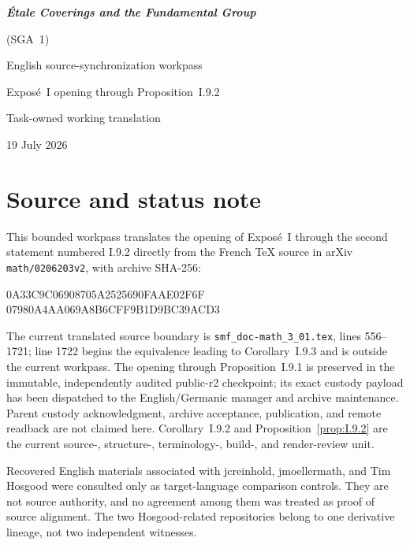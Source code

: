 \documentclass[11pt,oneside]{amsbook}
\begin{document}
\frontmatter
\begin{titlepage}
  \centering
  \vspace*{35mm}
  {\Huge\bfseries \textit{Étale Coverings and the Fundamental Group}\par}
  \vspace{3mm}
  {\LARGE (SGA~1)\par}
  \vspace{20mm}
  {\Large English source-synchronization workpass\par}
  \vspace{3mm}
  {\Large Exposé~I opening through Proposition~I.9.2\par}
  \vfill
  {\large Task-owned working translation\par}
  \vspace{5mm}
  {\large 19 July 2026\par}
\end{titlepage}

\chapter*{Source and status note}

This bounded workpass translates the opening of Exposé~I through the second
statement numbered I.9.2 directly
from the French \TeX{} source in arXiv \texttt{math/0206203v2}, with archive
SHA-256:
\begin{center}
  \small\ttfamily
  0A33C9C06908705A2525690FAAE02F6F\\
  07980A4AA069A8B6CFF9B1D9BC39ACD3
\end{center}
The current translated source boundary is
\texttt{smf\_doc-math\_3\_01.tex}, lines 556--1721; line 1722 begins the
equivalence leading to Corollary~I.9.3 and is outside the current workpass.
The opening through Proposition~I.9.1 is preserved in the immutable,
independently audited public-r2 checkpoint; its exact custody payload has been
dispatched to the English/Germanic manager and archive maintenance. Parent
custody acknowledgment, archive acceptance, publication, and remote readback
are not claimed here. Corollary~I.9.2 and Proposition~\ref{prop:I.9.2} are
the current source-, structure-, terminology-, build-, and render-review unit.

Recovered English materials associated with jcreinhold, jmoellermath, and
Tim Hosgood were consulted only as target-language comparison controls.
They are not source authority, and no agreement among them was treated as
proof of source alignment.  The two Hosgood-related repositories belong to
one derivative lineage, not two independent witnesses.
\end{document}
